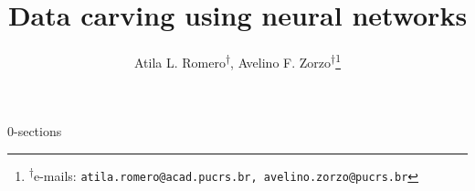 \documentclass[english,oneside]{article}
\author{Atila L. Romero\textsuperscript{$\dagger$}, Avelino F. Zorzo\textsuperscript{$\dagger$}{\let\thefootnote\relax\footnote{{\textsuperscript{$\dagger$}e-mails: \texttt{atila.romero@acad.pucrs.br, avelino.zorzo@pucrs.br}}}}}
\title{Data carving using neural networks}
\date{}
\begin{document}
\maketitle




{0-sections}

% 
%


\end{document}
